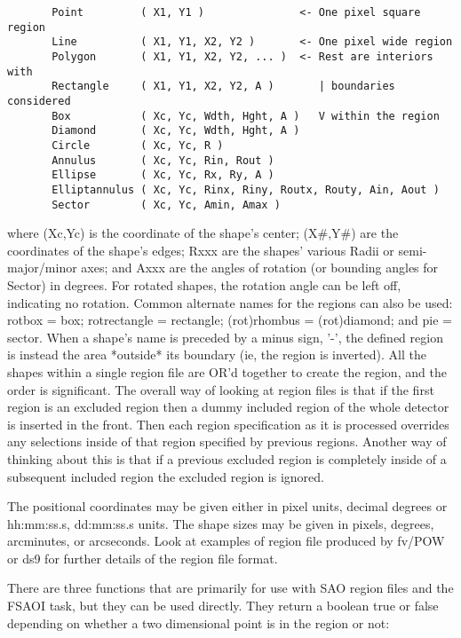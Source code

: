 \documentclass[11pt]{book}
\begin{document}
\begin{verbatim}
       Point         ( X1, Y1 )               <- One pixel square region
       Line          ( X1, Y1, X2, Y2 )       <- One pixel wide region
       Polygon       ( X1, Y1, X2, Y2, ... )  <- Rest are interiors with
       Rectangle     ( X1, Y1, X2, Y2, A )       | boundaries considered
       Box           ( Xc, Yc, Wdth, Hght, A )   V within the region
       Diamond       ( Xc, Yc, Wdth, Hght, A )
       Circle        ( Xc, Yc, R )
       Annulus       ( Xc, Yc, Rin, Rout )
       Ellipse       ( Xc, Yc, Rx, Ry, A )
       Elliptannulus ( Xc, Yc, Rinx, Riny, Routx, Routy, Ain, Aout )
       Sector        ( Xc, Yc, Amin, Amax )
\end{verbatim}
    where (Xc,Yc) is  the coordinate of  the shape's center; (X\#,Y\#) are
    the coordinates  of the shape's edges;  Rxxx are the shapes' various
    Radii or semi-major/minor  axes; and Axxx  are the angles of rotation
    (or bounding angles for Sector) in degrees.  For rotated shapes, the
    rotation angle  can  be left  off, indicating  no rotation.   Common
    alternate  names for the regions  can also be  used: rotbox = box;
    rotrectangle = rectangle;  (rot)rhombus = (rot)diamond;  and pie
    = sector.  When a  shape's name is  preceded by a minus sign, '-',
    the defined region  is instead the area  *outside* its boundary (ie,
    the region is inverted).  All the shapes within a single region
    file are OR'd together to create the region, and the order is
    significant. The overall way of looking at region files is that if
    the first region is an excluded region then a dummy included region
    of the whole detector is inserted in the front. Then each region
    specification as it is processed overrides any selections inside of
    that region specified by previous regions. Another way of thinking
    about this is that if a previous excluded region is completely
    inside of a subsequent included region the excluded region is
    ignored.

    The positional coordinates may be given either in pixel units,
    decimal degrees or hh:mm:ss.s, dd:mm:ss.s units.  The shape sizes
    may be given in pixels, degrees, arcminutes, or arcseconds.  Look
    at examples of region file produced by fv/POW or ds9 for further
    details of the region file format.

    There are three functions that are primarily for use with SAO region
    files and the  FSAOI  task, but they  can  be  used  directly.  They
    return  a  boolean true   or  false  depending   on  whether a   two
    dimensional point is in the region or not:
\end{document}
